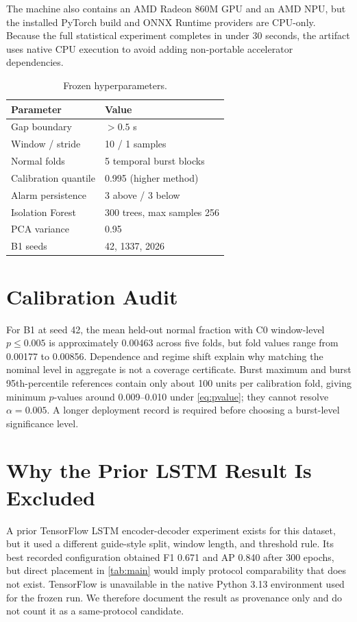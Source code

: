 \documentclass{article}
\begin{document}
The machine also contains an AMD Radeon 860M GPU and an AMD NPU, but the installed PyTorch build and ONNX Runtime providers are CPU-only. Because the full statistical experiment completes in under 30 seconds, the artifact uses native CPU execution to avoid adding non-portable accelerator dependencies.

\begin{table}[h]
\caption{Frozen hyperparameters.}
\label{tab:hyper}
\centering
\small
\begin{tabular}{ll}
\toprule
Parameter & Value \\
\midrule
Gap boundary & $>0.5$ s \\
Window / stride & 10 / 1 samples \\
Normal folds & 5 temporal burst blocks \\
Calibration quantile & 0.995 (higher method) \\
Alarm persistence & 3 above / 3 below \\
Isolation Forest & 300 trees, max samples 256 \\
PCA variance & 0.95 \\
B1 seeds & 42, 1337, 2026 \\
\bottomrule
\end{tabular}
\end{table}

\section{Calibration Audit}

For B1 at seed 42, the mean held-out normal fraction with C0 window-level $p\leq0.005$ is approximately 0.00463 across five folds, but fold values range from 0.00177 to 0.00856. Dependence and regime shift explain why matching the nominal level in aggregate is not a coverage certificate. Burst maximum and burst 95th-percentile references contain only about 100 units per calibration fold, giving minimum $p$-values around 0.009--0.010 under \cref{eq:pvalue}; they cannot resolve $\alpha=0.005$. A longer deployment record is required before choosing a burst-level significance level.

\section{Why the Prior LSTM Result Is Excluded}

A prior TensorFlow LSTM encoder-decoder experiment exists for this dataset, but it used a different guide-style split, window length, and threshold rule. Its best recorded configuration obtained F1 0.671 and AP 0.840 after 300 epochs, but direct placement in \cref{tab:main} would imply protocol comparability that does not exist. TensorFlow is unavailable in the native Python 3.13 environment used for the frozen run. We therefore document the result as provenance only and do not count it as a same-protocol candidate.
\end{document}

